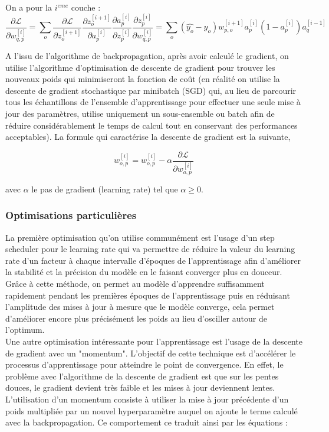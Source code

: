 \documentclass[12pt,english, openany]{book}
\begin{document}
On a pour la $i^{eme}$ couche :
$$
\frac{\partial{\mathcal{L}}}{\partial w^{[i]}_{q,p}} = \sum_o \frac{\partial{\mathcal{L}}}{\partial z_{o}^{[i+1]}} \frac{\partial{z_{o}^{[i+1]}}}{\partial{a_{p}^{[i]}}} \frac{\partial{a_{p}^{[i]}}}{\partial{z_{p}^{[i]}}} \frac{\partial{z_{p}^{[i]}}}{\partial w^{[i]}_{q,p}} = \sum_o (\hat{y_o} - y_o) w^{[i+1]}_{p,o}a^{[i]}_{p}(1-a_{p}^{[i]})a_{q}^{[i-1]}
$$

A l'issu de l'algorithme de backpropagation, après avoir calculé le gradient, on utilise l'algorithme d'optimisation de descente de gradient pour trouver les nouveaux poids qui minimiseront la fonction de coût (en réalité on utilise la descente de gradient stochastique par minibatch (SGD) qui, au lieu de parcourir tous les échantillons de l'ensemble d'apprentissage pour effectuer une seule mise à jour des paramètres, utilise uniquement un sous-ensemble ou batch afin de réduire considérablement le temps de calcul tout en conservant des performances acceptables). La formule qui caractérise la descente de gradient est la suivante,

$$
    w^{[i]}_{o,p} = w^{[i]}_{o,p} - \alpha \frac{\partial \mathcal{L}}{\partial w^{[i]}_{o,p}} 
$$

avec $\alpha$ le pas de gradient (learning rate) tel que $\alpha \geq 0$.

\subsubsection{Optimisations particulières}

La première optimisation qu'on utilise communément est l'usage d'un step scheduler pour le learning rate qui va permettre de réduire la valeur du learning rate d'un facteur à chaque intervalle d'époques de l'apprentissage afin d'améliorer la stabilité et la précision du modèle en le faisant converger plus en douceur. Grâce à cette méthode, on permet au modèle d'apprendre suffisamment rapidement pendant les premières époques de l'apprentissage puis en réduisant l'amplitude des mises à jour à mesure que le modèle converge, cela permet d'améliorer encore plus précisément les poids au lieu d'osciller autour de l'optimum.\\

Une autre optimisation intéressante pour l'apprentissage est l'usage de la descente de gradient avec un "momentum". L'objectif de cette technique est d'accélérer le processus d'apprentissage pour atteindre le point de convergence. En effet, le problème avec l'algorithme de la descente de gradient est que sur les pentes douces, le gradient devient très faible et les mises à jour deviennent lentes. L'utilisation d'un momentum consiste à utiliser la mise à jour précédente d'un poids multipliée par un nouvel hyperparamètre auquel on ajoute le terme calculé avec la backpropagation. Ce comportement ce traduit ainsi par les équations :
\end{document}

